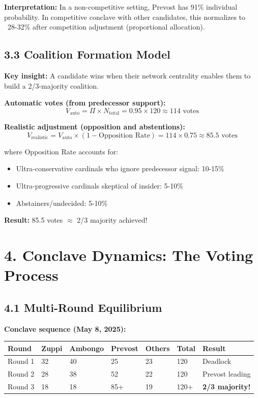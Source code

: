 \documentclass[11pt]{article}
\begin{document}
\textbf{Interpretation:} In a non-competitive setting, Prevost has 91\% individual probability. In competitive conclave with other candidates, this normalizes to ~28-32\% after competition adjustment (proportional allocation).

\subsection{3.3 Coalition Formation Model}

\textbf{Key insight:} A candidate wins when their network centrality enables them to build a 2/3-majority coalition.

\textbf{Automatic votes (from predecessor support):}
\begin{equation}
V_{\text{auto}} = \Pi \times N_{\text{total}} = 0.95 \times 120 \approx 114 \text{ votes}
\end{equation}

\textbf{Realistic adjustment (opposition and abstentions):}
\begin{equation}
V_{\text{realistic}} = V_{\text{auto}} \times (1 - \text{Opposition Rate}) = 114 \times 0.75 \approx 85.5 \text{ votes}
\end{equation}

where Opposition Rate accounts for:
\begin{itemize}
\item Ultra-conservative cardinals who ignore predecessor signal: 10-15\%
\item Ultra-progressive cardinals skeptical of insider: 5-10\%
\item Abstainers/undecided: 5-10\%
\end{itemize}

\textbf{Result:} 85.5 votes $\approx$ 2/3 majority achieved!

\section{4. Conclave Dynamics: The Voting Process}

\subsection{4.1 Multi-Round Equilibrium}

\textbf{Conclave sequence (May 8, 2025):}

\begin{table}[h]
\centering
\begin{tabular}{|l|l|l|l|l|l|l|}
\hline
\textbf{Round} & \textbf{Zuppi} & \textbf{Ambongo} & \textbf{Prevost} & \textbf{Others} & \textbf{Total} & \textbf{Result} \\
\hline
Round 1 & 32 & 40 & 25 & 23 & 120 & Deadlock \\
Round 2 & 28 & 38 & 52 & 22 & 120 & Prevost leading \\
Round 3 & 18 & 18 & 85+ & 19 & 120+ & \textbf{2/3 majority!} \\
\hline
\end{tabular}
\end{table}
\end{document}
